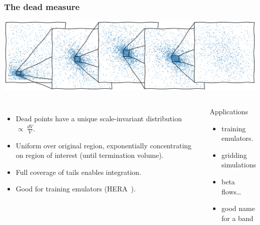 \documentclass[aspectratio=169]{beamer}
\begin{document}
\begin{frame}
\begin{columns}
    \end{columns}
\end{frame}

\begin{frame}
    \frametitle{The dead measure}
    \includegraphics[width=\textwidth]{figures/dead_measure}
    \begin{columns}
        \begin{itemize}
            \item Dead points have a unique scale-invariant distribution $\propto\: \tfrac{dV}{V}$.
            \item Uniform over original region, exponentially concentrating on region of interest (until termination volume).
            \item Full coverage of tails enables integration.
            \item Good for training emulators (HERA~).
        \end{itemize}
        \begin{block}{Applications}
        \begin{itemize}
            \item training emulators.
            \item gridding simulations
            \item beta flows\ldots
            \item good name for a band
        \end{itemize}
        \end{block}
    \end{columns}
\end{frame}
\end{document}
